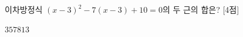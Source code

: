이차방정식 $(x-3)^2-7(x-3)+10=0$의 두 근의 합은? \mbox{[4점]}
\begin{choices32}{$3$}{$5$}{$7$}{$8$}{$13$}\end{choices32}
